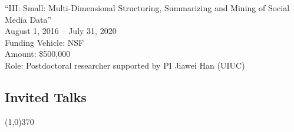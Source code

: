 \documentclass[10pt]{article}
\newenvironment{myindentpar}[1]%
{\begin{list}{}%
         {\setlength{\leftmargin}{#1}}%
         \item[]%
}
{\end{list}}
\newcounter{list}
\begin{document}
\begin{myindentpar}{0.75cm}
\hspace{-0.75cm}``III: Small: Multi-Dimensional Structuring, Summarizing and Mining of Social Media Data''\\
August 1, 2016 -- July 31, 2020 \\
Funding Vehicle: NSF \\
Amount: \$500,000 \\
Role: Postdoctoral researcher supported by PI Jiawei Han (UIUC)

\end{myindentpar}

\subsection{\sc Invited Talks}
\vspace{-0.4cm} \line(1,0){370} \vspace{-0.1cm}
\end{document}
